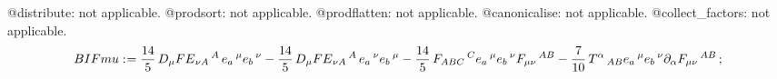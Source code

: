 \documentclass[11pt]{article}
\def\specialcolon{\mathrel{\mathop{:}}\hspace{-.5em}}
\begin{document}
@distribute: not applicable.
@prodsort: not applicable.
@prodflatten: not applicable.
@canonicalise: not applicable.
@collect\_factors: not applicable.
\begin{dmath*}[compact, spread=2pt]
BIFmu\specialcolon{}= \frac{14}{5}\, {D}_{\mu}{{FE}_{\nu A}\,^{A}}\,  {e}_{a}\,^{\mu} {e}_{b}\,^{\nu} - \frac{14}{5}\, {D}_{\mu}{{FE}_{\nu A}\,^{A}}\,  {e}_{a}\,^{\nu} {e}_{b}\,^{\mu} - \frac{14}{5}\, {F}_{A B C}\,^{C} {e}_{a}\,^{\mu} {e}_{b}\,^{\nu} {F}_{\mu \nu}\,^{A B} - \frac{7}{10}\, {T}^{\alpha}\,_{A B} {e}_{a}\,^{\mu} {e}_{b}\,^{\nu} {\partial}_{\alpha}{{F}_{\mu \nu}\,^{A B}}\, ;
\end{dmath*}
\end{document}
